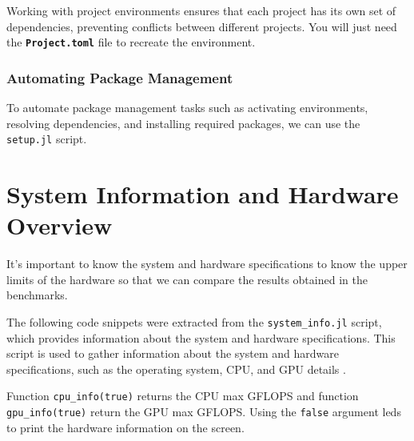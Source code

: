 Working with project environments ensures that each project has its own set of dependencies,
preventing conflicts between different projects. You will just need the \textbf{\texttt{Project.toml}} file to recreate the environment.


\subsubsection*{Automating Package Management}

To automate package management tasks such as activating environments, resolving
dependencies, and installing required packages, we can use the \texttt{setup.jl} script.




\section{System Information and Hardware Overview}

It's important to know the system and hardware specifications to know the upper limits of the hardware so that we can compare the results obtained in the benchmarks.

The following code snippets were extracted from the \texttt{system\_info.jl} script, which provides information about the system and hardware specifications.
This script is used to gather information about the system and hardware specifications, such as the operating system, CPU, and GPU details \cite{GPUComputeCapability}.

Function \texttt{cpu\_info(true)} returns the CPU max GFLOPS and function \texttt{gpu\_info(true)} return the GPU max GFLOPS. Using the \texttt{false} argument leds to print the hardware information on the screen.

